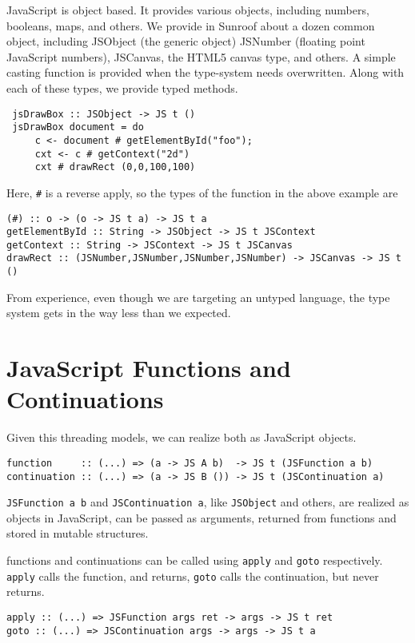 \documentclass{llncs}
\begin{document}
JavaScript is object based. It provides various objects,
including numbers, booleans, maps, and others. We
provide in Sunroof about a dozen common object,
including JSObject (the generic object) JSNumber
(floating point JavaScript numbers), JSCanvas,
the HTML5 canvas type, and others. A simple
casting function is provided when the type-system
needs overwritten.  Along with each of these types,
we provide typed methods.

\begin{verbatim}
 jsDrawBox :: JSObject -> JS t ()
 jsDrawBox document = do
     c <- document # getElementById("foo");
     cxt <- c # getContext("2d")
     cxt # drawRect (0,0,100,100)
\end{verbatim}

Here, \verb|#| is a reverse apply, so the types
of the function in the above example are
\begin{verbatim}
(#) :: o -> (o -> JS t a) -> JS t a
getElementById :: String -> JSObject -> JS t JSContext
getContext :: String -> JSContext -> JS t JSCanvas
drawRect :: (JSNumber,JSNumber,JSNumber,JSNumber) -> JSCanvas -> JS t ()
\end{verbatim}        

From experience, even though we are targeting
an untyped language, the type system gets in the
way less than we expected.

\section{JavaScript Functions and Continuations}

Given this threading models, we can realize both as 
JavaScript objects. 
\begin{verbatim}
function     :: (...) => (a -> JS A b)  -> JS t (JSFunction a b)
continuation :: (...) => (a -> JS B ()) -> JS t (JSContinuation a)
\end{verbatim}

\verb|JSFunction a b| and \verb|JSContinuation a|,
like \verb|JSObject| and others, are realized as objects
in JavaScript, can be passed as arguments, returned
from functions and stored in mutable structures.

functions and continuations can be called using \verb|apply|
and \verb|goto| respectively. \verb|apply| calls the function,
and returns, \verb|goto| calls the continuation, but never
returns.
\begin{verbatim}
apply :: (...) => JSFunction args ret -> args -> JS t ret
goto :: (...) => JSContinuation args -> args -> JS t a
\end{verbatim}
\end{document}
